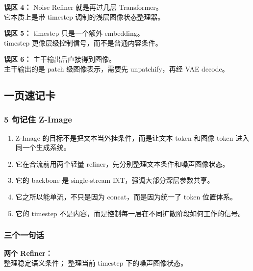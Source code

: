\begin{warnbox}
\textbf{误区 4：} Noise Refiner 就是再过几层 Transformer。\\
 它本质上是带 timestep 调制的浅层图像状态整理器。
\end{warnbox}

\begin{warnbox}
\textbf{误区 5：} timestep 只是一个额外 embedding。\\
 timestep 更像层级控制信号，而不是普通内容条件。
\end{warnbox}

\begin{warnbox}
\textbf{误区 6：} 主干输出后直接得到图像。\\
 主干输出的是 patch 级图像表示，需要先 unpatchify，再经 VAE decode。
\end{warnbox}

\subsection{一页速记卡}

\subsubsection{5 句记住 Z-Image}

\begin{enumerate}[leftmargin=1.5em]
  \item Z-Image 的目标不是把文本当外挂条件，而是让文本 token 和图像 token 进入同一个生成系统。
  \item 它在合流前用两个轻量 refiner，先分别整理文本条件和噪声图像状态。
  \item 它的 backbone 是 single-stream DiT，强调大部分深层参数共享。
  \item 它之所以能单流，不只是因为 concat，而是因为统一了 token 位置体系。
  \item 它的 timestep 不是内容，而是控制每一层在不同扩散阶段如何工作的信号。
\end{enumerate}

\subsubsection{三个一句话}

\begin{summarybox}
\textbf{两个 Refiner：}\\
 整理稳定语义条件； 整理当前 timestep 下的噪声图像状态。
\end{summarybox}

